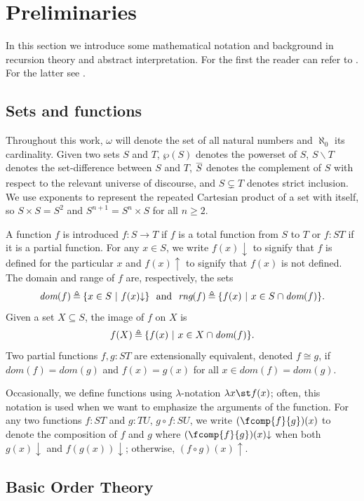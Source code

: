 \documentclass[runningheads]{llncs}
\makeatletter
\def\ok#1{\mbox{\raisebox{0ex}[1ex][1ex]{$#1$}}}
\newcommand{\compl}[1]{\ok{\overline{#1}}}
\newcommand{\ra}{\rightarrow}
\newcommand{\range}{\textit{rng}}
\newcommand{\dom}{\textit{dom}}
\newcommand{\ud}{\ok{\:\triangleq\:}}
\def\ok#1{\mbox{\raisebox{0ex}[1ex][1ex]{$#1$}}}
\newcommand{\sset}[2]{\{#1  ~|~ #2\}}
\newcommand{\nat}{\omega}
\newcommand{\pto}{}%
\DeclareRobustCommand{\pto}{\mathrel{\mathpalette\p@to@gets\to}}
\newcommand{\p@to@gets}[2]{%
  \ooalign{\hidewidth$\m@th#1\mapstochar\mkern5mu$\hidewidth\cr$\m@th#1\to$\cr}%
}
\newcommand{\defined}{{\downarrow}}
\makeatother
\begin{document}
\section{Preliminaries}
%
In this section we introduce some mathematical notation and background in recursion theory and abstract interpretation. For the first the reader can refer to \cite{odifreddi,soare,rogers}. For the latter see \cite{CC77,CC79,Cousotbook}.

\subsection{Sets and functions}
Throughout this work, $\nat$ will denote the set of all natural numbers and $\aleph_0$ its cardinality. 
Given two sets $S$ and $T$, $\wp(S)$ denotes the powerset of $S$, $S \smallsetminus T$ denotes the set-difference between $S$ and $T$, 
$\compl{S}$ denotes the complement of $S$ with respect to the relevant universe of 
discourse, and $S \subsetneq T$ denotes strict inclusion. We use exponents to
represent the repeated Cartesian product of a set with itself, so
\(S \times S = S^2 \) and \(S^{n+1} = S^n \times S\) for all \(n \geq 2\).

A function \(f\) is introduced $f:S\ra T$ if \(f\) is a total function from \(S\)
to \(T\) or $f: S\pto T$ if it is a partial function. For any \(x \in S\), we write
$f(x){\downarrow}$ to signify that \(f\) is defined for the particular \(x\) and
$f(x){\uparrow}$ to signify that $f(x)$ is not defined. The domain and range of $f$ are, respectively, the sets
\[\dom(f) \ud \sset{x \in S }{ f(x){\downarrow}}~~\mbox{and}~~\range(f)\ud\sset{f(x)}{x \in S\cap \dom(f)}.\] 
Given a set $X\subseteq S$, the image of \(f\) on \(X\) is
\[\ok f(X) \ud \{f(x)~|~x\in X\cap \dom(f)\}.\]
Two partial functions $f,g: S\pto T$ are extensionally equivalent, denoted $f\cong g$, if $\dom(f)=\dom(g)$ and \(f(x) = g(x)\) for all \(x \in \dom(f) = \dom(g)\).

Occasionally, we define functions using $\lambda$-notation $\lambda x \st f(x)$; 
often, this notation is used when we want to emphasize the arguments of the function.
For any two functions $f : S \pto T$ and $g : T \pto U$, $g \circ f : S \pto U$, we write
\((\fcomp{f}{g})(x)\) to denote the composition of \(f\) and \(g\) where
\((\fcomp{f}{g})(x)\defined\) when both $g(x)\defined$ and $f(g(x))\defined$; otherwise,
$(f \circ g)(x){\uparrow}$. 

\subsection{Basic Order Theory}
\end{document}
